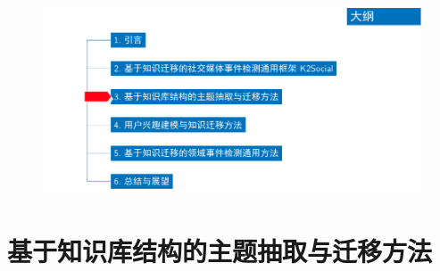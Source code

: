 \begin{withoutheadline}
\begin{frame}
\vspace*{-13mm}
\begin{figure}
	\hspace*{-4.2mm}
    \includegraphics[width=1.0\paperwidth]{img/contents3_output.pdf}
\end{figure}

\end{frame}
\end{withoutheadline}

\section{基于知识库结构的主题抽取与迁移方法}

